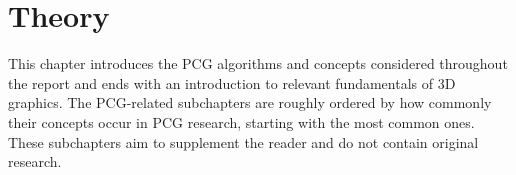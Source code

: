 \chapter{Theory}

This chapter introduces the PCG algorithms and concepts considered throughout the report and ends with an introduction to relevant fundamentals of 3D graphics.
The PCG-related subchapters are roughly ordered by how commonly their concepts occur in PCG research, starting with the most common ones.
These subchapters aim to supplement the reader and do not contain original research.









